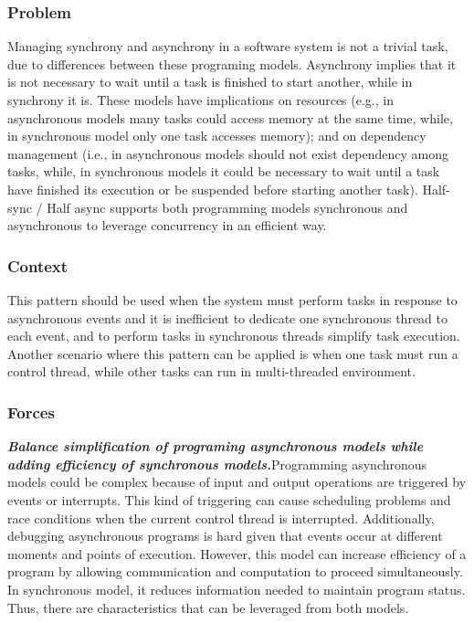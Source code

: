 \subsubsection{Problem}

Managing synchrony and asynchrony in a software system is not a trivial task, due to differences between these programing models. Asynchrony implies that it is not necessary to wait until a task is finished to start another, while in synchrony it is. These models have implications on resources (e.g., in asynchronous models many tasks could access memory at the same time, while, in synchronous model only one task accesses memory); and on dependency management (i.e., in asynchronous models should not exist dependency among tasks, while, in synchronous models it could be necessary to wait until a task have finished its execution or be suspended before starting another task). Half-sync / Half async supports both programming models synchronous and asynchronous to leverage concurrency in an efficient way. 


\subsubsection{Context}

This pattern should be used when the system must perform tasks in response to asynchronous events and it is inefficient to dedicate one synchronous thread to each event, and to perform tasks in synchronous threads simplify task execution. Another scenario where this pattern can be applied is when one task must run a control thread, while other tasks can run in multi-threaded environment.

\subsubsection{Forces}

\noindent\textbf{\textit{Balance simplification of programing asynchronous models while adding efficiency of synchronous models.}}Programming asynchronous models could be complex because of input and output operations are triggered by events or interrupts. This kind of triggering can cause scheduling problems and race conditions when the current control thread is interrupted. Additionally, debugging asynchronous programs is hard given that events occur at different moments and points of execution. However, this model can increase efficiency of a program by allowing communication and computation to proceed simultaneously. In synchronous model, it reduces information needed to maintain program status. Thus, there are characteristics that can be leveraged from both models.


